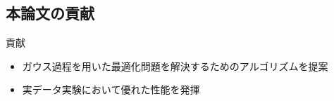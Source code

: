 \documentclass[dvipdfmx, 10.5pt]{beamer}
\begin{document}




\subsection{本論文の貢献}

\begin{frame}{\insertsubsection}

		\begin{block}{貢献}
			\begin{itemize}
				\item ガウス過程を用いた最適化問題を解決するためのアルゴリズムを提案
				\item 実データ実験において優れた性能を発揮
			\end{itemize}
		\end{block}



\end{frame}
\end{document}
